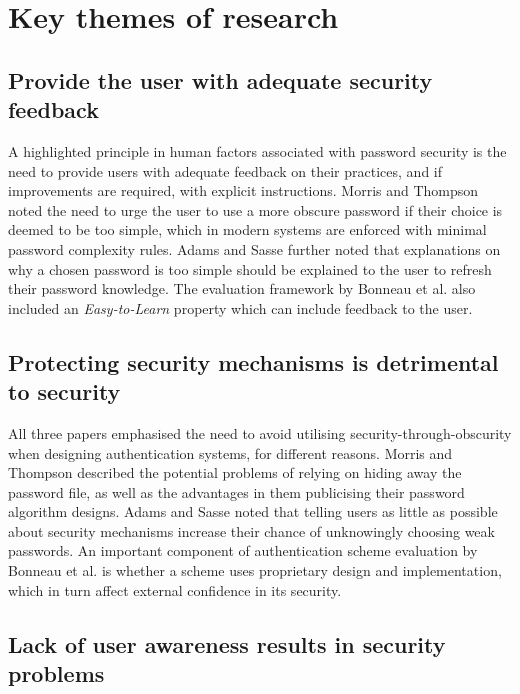 \documentclass[11pt]{article}
\begin{document}
\section{Key themes of research}

\subsection{Provide the user with adequate security feedback}

A highlighted principle in human factors associated with password security is the need to provide users with adequate feedback on their practices, and if improvements are required, with explicit instructions. Morris and Thompson \cite[p. 596]{morris1979password} noted the need to urge the user to use a more obscure password if their choice is deemed to be too simple, which in modern systems are enforced with minimal password complexity rules. Adams and Sasse \cite[p. 6]{adams1999users} further noted that explanations on why a chosen password is too simple should be explained to the user to refresh their password knowledge. The evaluation framework by Bonneau et al. \cite[Sec. II]{bonneau2012quest} also included an \emph{Easy-to-Learn} property which can include feedback to the user.

\subsection{Protecting security mechanisms is detrimental to security}

All three papers emphasised the need to avoid utilising security-through-obscurity when designing authentication systems, for different reasons. Morris and Thompson \cite[p. 594, p.597]{morris1979password} described the potential problems of relying on hiding away the password file, as well as the advantages in them 
publicising their password algorithm designs. Adams and Sasse \cite[p. 4]{adams1999users} noted that telling users as little as possible about security mechanisms increase their chance of unknowingly choosing weak passwords. An important component of authentication scheme evaluation by Bonneau et al. \cite[Sec. IV]{bonneau2012quest} is whether a scheme uses proprietary design and implementation, which in turn affect external confidence in its security.

\subsection{Lack of user awareness results in security problems}
\end{document}
